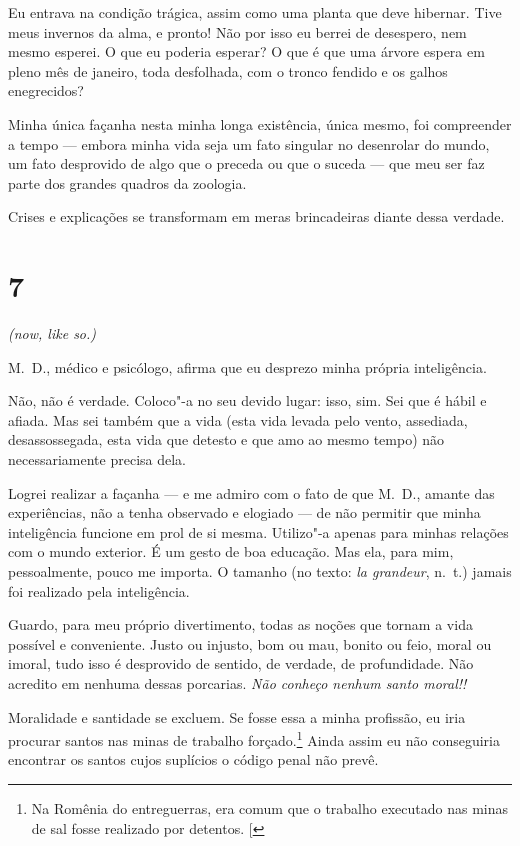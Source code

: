 Eu entrava na condição trágica, assim como uma planta que deve hibernar.
Tive meus invernos da alma, e pronto! Não por isso eu berrei de
desespero, nem mesmo esperei. O que eu poderia esperar? O que é que uma
árvore espera em pleno mês de janeiro, toda desfolhada, com o tronco
fendido e os galhos enegrecidos?

Minha única façanha nesta minha longa existência, única mesmo, foi
compreender a tempo --- embora minha vida seja um fato singular no
desenrolar do mundo, um fato desprovido de algo que o preceda ou que o
suceda --- que meu ser faz parte dos grandes quadros da zoologia.

Crises e explicações se transformam em meras brincadeiras diante dessa
verdade.

\section{7}

\emph{(now, like so.)}

M.~D., médico e psicólogo, afirma que eu desprezo minha própria
inteligência.

Não, não é verdade. Coloco"-a no seu devido lugar: isso, sim. Sei que é
hábil e afiada. Mas sei também que a vida (esta vida levada pelo vento,
assediada, desassossegada, esta vida que detesto e que amo ao mesmo
tempo) não necessariamente precisa dela.

Logrei realizar a façanha --- e me admiro com o fato de que M.~D., amante
das experiências, não a tenha observado e elogiado --- de não permitir que
minha inteligência funcione em prol de si mesma. Utilizo"-a apenas para
minhas relações com o mundo exterior. É um gesto de boa educação. Mas
ela, para mim, pessoalmente, pouco me importa. O tamanho (no texto: \emph{la
grandeur}, n.~t.) jamais foi realizado pela inteligência.

Guardo, para meu próprio divertimento, todas as noções que tornam a vida
possível e conveniente. Justo ou injusto, bom ou mau, bonito ou feio,
moral ou imoral, tudo isso é desprovido de sentido, de verdade, de
profundidade. Não acredito em nenhuma dessas porcarias. \emph{Não
conheço nenhum santo moral!!}

Moralidade e santidade se excluem. Se fosse essa a minha profissão, eu
iria procurar santos nas minas de trabalho
forçado.\footnote{Na Romênia do entreguerras, era comum que o trabalho executado nas minas de sal fosse realizado por detentos. {[}\versal{N.~T.}{]}} Ainda
assim eu não conseguiria encontrar os santos cujos suplícios o código
penal não prevê.

